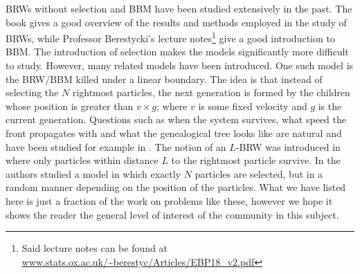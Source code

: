 \begin{remark}BRWs without selection and BBM have been studied extensively in the past. The book \cite{shi2015branching} gives a good overview of the results and methods employed in the study of BRWs, while Professor Berestycki's lecture notes\footnote{Said lecture notes can be found at \url{www.stats.ox.ac.uk/~berestyc/Articles/EBP18_v2.pdf}} give a good introduction to BBM. The introduction of selection makes the models significantly more difficult to study. However, many related models have been introduced. One such model is the BRW/BBM killed under a linear boundary. The idea is that instead of selecting the $N$ rightmost particles, the next generation is formed by the children whose position is greater than $v \times g$; where $v$ is some fixed velocity and $g$ is the current generation. Questions such as when the system survives, what speed the front propagates with and what the genealogical tree looks like are natural and have been studied for example in \cite{gantert2008asymptotics, harris2007survival, berestycki2013genealogy}. The notion of an $L$-BRW was introduced in \cite{brunet2006phenomenological} where only particles within distance $L$ to the rightmost particle survive. In \cite{cortines2016n} the authors studied a model in which exactly $N$ particles are selected, but in a random manner depending on the position of the particles. What we have listed here is just a fraction of the work on problems like these, however we hope it shows the reader the general level of interest of the community in this subject. 
\end{remark}








